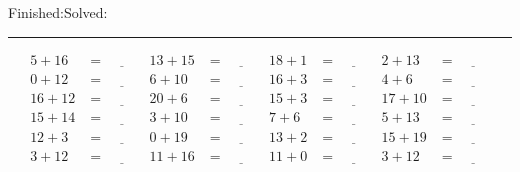 \documentclass{article}
\begin{document}
\begin{sloppy}
\begin{center}
{\selectfont {Started:}\underline{\hspace{1.5cm}}{Finished:}\underline{\hspace{1.5cm}}{Solved:}\underline{\hspace{1.5cm}}}
\end{center}
\hrule
\begin{align*}
    {5} + {16} &= \underline{\hspace{1cm}} & {13} + {15} &= \underline{\hspace{1cm}} & {18} + {1} &= \underline{\hspace{1cm}} & {2} + {13} &= \underline{\hspace{1cm}} \\
    {0} + {12} &= \underline{\hspace{1cm}} & {6} + {10} &= \underline{\hspace{1cm}} & {16} + {3} &= \underline{\hspace{1cm}} & {4} + {6} &= \underline{\hspace{1cm}} \\
    {16} + {12} &= \underline{\hspace{1cm}} & {20} + {6} &= \underline{\hspace{1cm}} & {15} + {3} &= \underline{\hspace{1cm}} & {17} + {10} &= \underline{\hspace{1cm}} \\
    {15} + {14} &= \underline{\hspace{1cm}} & {3} + {10} &= \underline{\hspace{1cm}} & {7} + {6} &= \underline{\hspace{1cm}} & {5} + {13} &= \underline{\hspace{1cm}} \\
    {12} + {3} &= \underline{\hspace{1cm}} & {0} + {19} &= \underline{\hspace{1cm}} & {13} + {2} &= \underline{\hspace{1cm}} & {15} + {19} &= \underline{\hspace{1cm}} \\
    {3} + {12} &= \underline{\hspace{1cm}} & {11} + {16} &= \underline{\hspace{1cm}} & {11} + {0} &= \underline{\hspace{1cm}} & {3} + {12} &= \underline{\hspace{1cm}} \\

\end{align*}
\end{sloppy}
\end{document}
